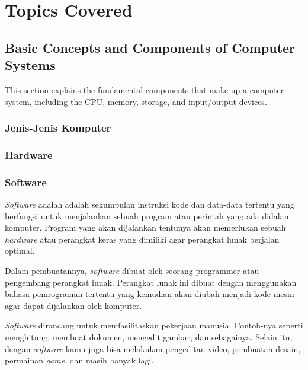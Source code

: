 \documentclass[12pt]{article}
\begin{document}
\section{Topics Covered}

\subsection{Basic Concepts and Components of Computer Systems}
This section explains the fundamental components that make up a computer system, including the CPU, memory, storage, and input/output devices.
\subsubsection{Jenis-Jenis Komputer}
\subsubsection{Hardware}
\subsubsection{Software}
    \par
    \hspace{0.61cm}\textit{Software} adalah adalah sekumpulan instruksi kode dan data-data tertentu yang berfungsi untuk menjalankan sebuah program atau perintah yang ada didalam komputer. Program yang akan dijalankan tentunya akan memerlukan sebuah \textit{hardware} atau perangkat keras yang dimiliki agar perangkat lunak berjalan optimal.

    Dalam pembuatannya, \textit{software} dibuat oleh seorang programmer atau pengembang perangkat lunak. Perangkat lunak ini dibuat dengan menggunakan bahasa pemrograman tertentu yang kemudian akan diubah menjadi kode mesin agar dapat dijalankan oleh komputer.

    \textit{Software} dirancang untuk memfasilitaskan pekerjaan manusia. Contoh-nya seperti menghitung, membuat dokumen, mengedit gambar, dan sebagainya. Selain itu, dengan \textit{software} kamu juga bisa melakukan pengeditan video, pembuatan desain, permainan \textit{game}, dan masih banyak lagi.
\end{document}
